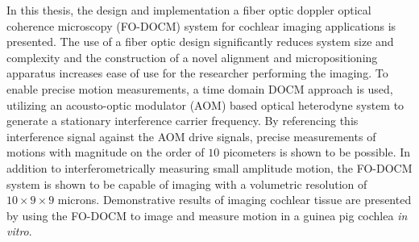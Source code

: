 % 
% 
%

In this thesis, the design and implementation a fiber optic doppler optical coherence microscopy (FO-DOCM) system for cochlear imaging applications is presented. The use of a fiber optic design significantly reduces system size and complexity and the construction of a novel alignment and micropositioning apparatus increases ease of use for the researcher performing the imaging. To enable precise motion measurements, a time domain DOCM approach is used, utilizing an acousto-optic modulator (AOM) based optical heterodyne system to generate a stationary interference carrier frequency. By referencing this interference signal against the AOM drive signals, precise measurements of motions with magnitude on the order of $10$ picometers is shown to be possible. In addition to interferometrically measuring small amplitude motion, the FO-DOCM system is shown to be capable of imaging with a volumetric resolution of $10 \times 9 \times 9$ microns. Demonstrative results of imaging cochlear tissue are presented by using the FO-DOCM to image and measure motion in a guinea pig cochlea {\em in vitro}.

